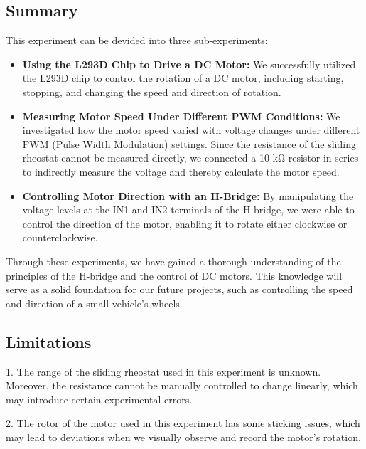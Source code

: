 \documentclass[a4paper,12pt]{article}
\begin{document}
\subsection*{Summary}
This experiment can be devided into three sub-experiments:
\begin{itemize}
  \item \textbf{Using the L293D Chip to Drive a DC Motor:} 
  We successfully utilized the L293D chip to control the rotation of a DC motor, 
  including starting, stopping, and changing the speed and direction of rotation.
  \item \textbf{Measuring Motor Speed Under Different PWM Conditions:} 
  We investigated how the motor speed varied with voltage changes under different PWM (Pulse Width Modulation) settings. 
  Since the resistance of the sliding rheostat cannot be measured directly, 
  we connected a 10 kΩ resistor in series to indirectly measure the voltage and thereby calculate the motor speed.
  \item \textbf{Controlling Motor Direction with an H-Bridge:} 
  By manipulating the voltage levels at the IN1 and IN2 terminals of the H-bridge, 
  we were able to control the direction of the motor, 
  enabling it to rotate either clockwise or counterclockwise.
\end{itemize}
Through these experiments, 
we have gained a thorough understanding of the principles of the H-bridge and the control of DC motors. 
This knowledge will serve as a solid foundation for our future projects, 
such as controlling the speed and direction of a small vehicle's wheels.

\subsection*{Limitations}
1. The range of the sliding rheostat used in this experiment is unknown. 
Moreover, the resistance cannot be manually controlled to change linearly, 
which may introduce certain experimental errors.

2. The rotor of the motor used in this experiment has some sticking issues, 
which may lead to deviations when we visually observe and record the motor’s rotation.

\newpage
\end{document}
